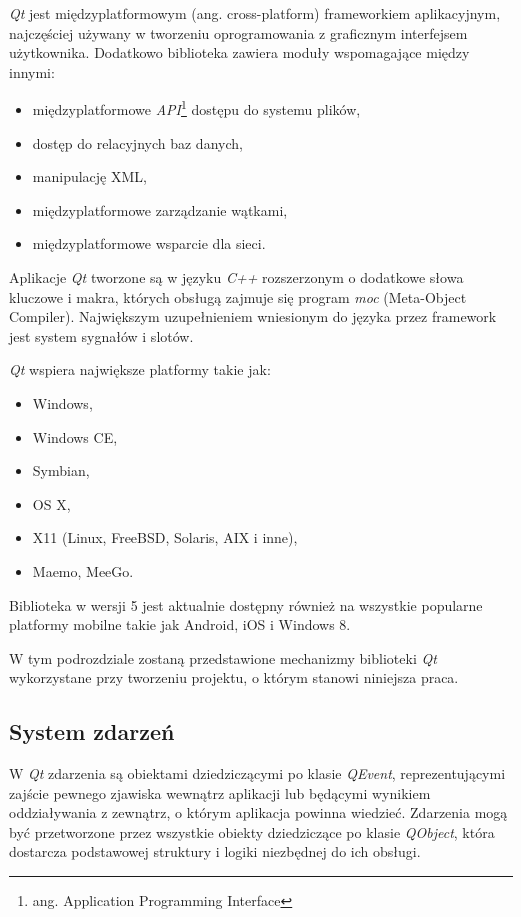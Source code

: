 \emph{Qt} jest międzyplatformowym (ang. cross-platform) frameworkiem aplikacyjnym, najczęściej używany w tworzeniu oprogramowania z graficznym interfejsem użytkownika.
Dodatkowo biblioteka zawiera moduły wspomagające między innymi:
\begin{itemize}
\item międzyplatformowe \emph{API}\footnote{ang. Application Programming Interface} dostępu do systemu plików,
\item dostęp do relacyjnych baz danych,
\item manipulację XML,
\item międzyplatformowe zarządzanie wątkami,
\item międzyplatformowe wsparcie dla sieci.
\end{itemize}

Aplikacje \emph{Qt} tworzone są w języku \emph{C++} rozszerzonym o dodatkowe słowa kluczowe i makra, których obsługą zajmuje się program \emph{moc} (Meta-Object Compiler). Największym uzupełnieniem wniesionym do języka przez framework jest system sygnałów i slotów.

\emph{Qt} wspiera największe platformy takie jak:
\begin{itemize}
\item Windows,
\item Windows CE,
\item Symbian,
\item OS X,
\item X11 (Linux, FreeBSD, Solaris, AIX i inne),
\item Maemo, MeeGo.
\end{itemize}

Biblioteka w wersji 5 jest aktualnie dostępny również na wszystkie popularne platformy mobilne takie jak Android, iOS i Windows 8.

W tym podrozdziale zostaną przedstawione mechanizmy biblioteki \emph{Qt} wykorzystane przy tworzeniu projektu, o którym stanowi niniejsza praca. 

\subsection{System zdarzeń}
W \emph{Qt} zdarzenia są obiektami dziedziczącymi po klasie \emph{QEvent}, reprezentującymi zajście pewnego zjawiska wewnątrz aplikacji lub będącymi wynikiem oddziaływania z zewnątrz, o którym aplikacja powinna wiedzieć. Zdarzenia mogą być przetworzone przez wszystkie obiekty dziedziczące po klasie \emph{QObject}, która dostarcza podstawowej struktury i logiki niezbędnej do ich obsługi. 

